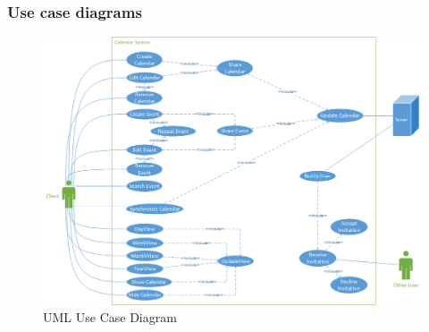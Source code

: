 \subsubsection{Use case diagrams}

\begin{figure}[ht!]
\centering
\includegraphics[width=160mm]{Figures/UseCaseDiagram.png}
\caption{UML Use Case Diagram \label{overflow}}
\end{figure}

\pagebreak